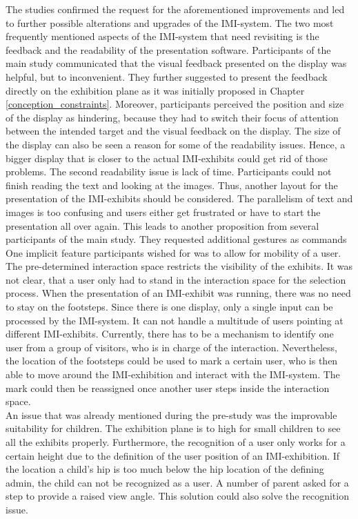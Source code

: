 The studies confirmed the request for the aforementioned improvements and led to further possible alterations and upgrades of the \ac{IMI}-system. The two most frequently mentioned aspects of the \ac{IMI}-system that need revisiting is the feedback and the readability of the presentation software. Participants of the main study communicated that the visual feedback presented on the display was helpful, but to inconvenient. They further suggested to present the feedback directly on the exhibition plane as it was initially proposed in Chapter \ref{conception_constraints}. Moreover, participants perceived the position and size of the display as hindering, because they had to switch their focus of attention between the intended target and the visual feedback on the display. The size of the display can also be seen a reason for some of the readability issues. Hence, a bigger display that is closer to the actual \ac{IMI}-exhibits could get rid of those problems. The second readability issue is lack of time. Participants could not finish reading the text and looking at the images. Thus, another layout for the presentation of the \ac{IMI}-exhibits should be considered. The parallelism of text and images is too confusing and users either get frustrated or have to start the presentation all over again. This leads to another proposition from several participants of the main study. They requested additional gestures as commands
\\
One implicit feature participants wished for was to allow for mobility of a user. The pre-determined interaction space restricts the visibility of the exhibits. It was not clear, that a user only had to stand in the interaction space for the selection process. When the presentation of an \ac{IMI}-exhibit was running, there was no need to stay on the footsteps. Since there is one display, only a single input can be processed by the \ac{IMI}-system. It can not handle a multitude of users pointing at different \ac{IMI}-exhibits. Currently, there has to be a mechanism to identify one user from a group of visitors, who is in charge of the interaction. Nevertheless, the location of the footsteps could be used to mark a certain user, who is then able to move around the \ac{IMI}-exhibition and interact with the \ac{IMI}-system. The mark could then be reassigned once another user steps inside the interaction space.
\\
An issue that was already mentioned during the pre-study was the improvable suitability for children. The exhibition plane is to high for small children to see all the exhibits properly. Furthermore, the recognition of a user only works for a certain height due to the definition of the user position of an \ac{IMI}-exhibition. If the location a child's hip is too much below the hip location of the defining admin, the child can not be recognized as a user. A number of parent asked for a step to provide a raised view angle. This solution could also solve the recognition issue.

